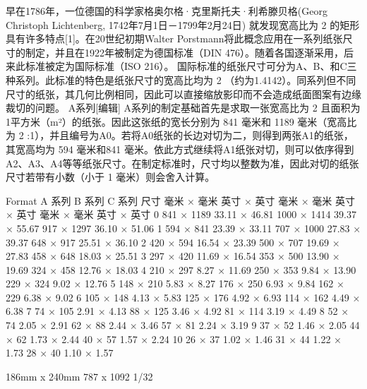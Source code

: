 \documentclass[main.tex]{subfiles}
\begin{document}
早在1786年，一位德国的科学家格奥尔格·克里斯托夫·利希滕贝格(Georg Christoph Lichtenberg, 1742年7月1日－1799年2月24日) 就发现宽高比为
2
的矩形具有许多特点[1]。在20世纪初期Walter Porstmann将此概念应用在一系列纸张尺寸的制定，并且在1922年被制定为德国标准（DIN 476）。随着各国逐渐采用，后来此标准被定为国际标准（ISO 216）。
国际标准的纸张尺寸可分为A、B、和C三种系列。此标准的特色是纸张尺寸的宽高比均为
2
（约为1.4142）。同系列但不同尺寸的纸张，其几何比例相同，因此可以直接缩放影印而不会造成纸面图案有边缘裁切的问题。
A系列[编辑]
A系列的制定基础首先是求取一张宽高比为
2
且面积为1平方米（m²）的纸张。因此这张纸的宽长分别为 841 毫米和 1189 毫米（宽高比为
2
:1），并且编号为A0。若将A0纸张的长边对切为二，则得到两张A1的纸张，其宽高均为 594 毫米和841 毫米。依此方式继续将A1纸张对切，则可以依序得到A2、A3、A4等等纸张尺寸。在制定标准时，尺寸均以整数为准，因此对切的纸张尺寸若带有小数（小于 1 毫米）则会舍入计算。

Format	A 系列	B 系列	C 系列
尺寸	毫米 × 毫米	英寸 × 英寸	毫米 × 毫米	英寸 × 英寸	毫米 × 毫米	英寸 × 英寸
0	841 × 1189	33.11 × 46.81	1000 × 1414	39.37 × 55.67	917 × 1297	36.10 × 51.06
1	594 × 841	23.39 × 33.11	707 × 1000	27.83 × 39.37	648 × 917	25.51 × 36.10
2	420 × 594	16.54 × 23.39	500 × 707	19.69 × 27.83	458 × 648	18.03 × 25.51
3	297 × 420	11.69 × 16.54	353 × 500	13.90 × 19.69	324 × 458	12.76 × 18.03
4	210 × 297	8.27 × 11.69	250 × 353	9.84 × 13.90	229 × 324	9.02 × 12.76
5	148 × 210	5.83 × 8.27	176 × 250	6.93 × 9.84	162 × 229	6.38 × 9.02
6	105 × 148	4.13 × 5.83	125 × 176	4.92 × 6.93	114 × 162	4.49 × 6.38
7	74 × 105	2.91 × 4.13	88 × 125	3.46 × 4.92	81 × 114	3.19 × 4.49
8	52 × 74	2.05 × 2.91	62 × 88	2.44 × 3.46	57 × 81	2.24 × 3.19
9	37 × 52	1.46 × 2.05	44 × 62	1.73 × 2.44	40 × 57	1.57 × 2.24
10	26 × 37	1.02 × 1.46	31 × 44	1.22 × 1.73	28 × 40	1.10 × 1.57


186mm x 240mm
787 x 1092 1/32 
\newpage
\end{document}
